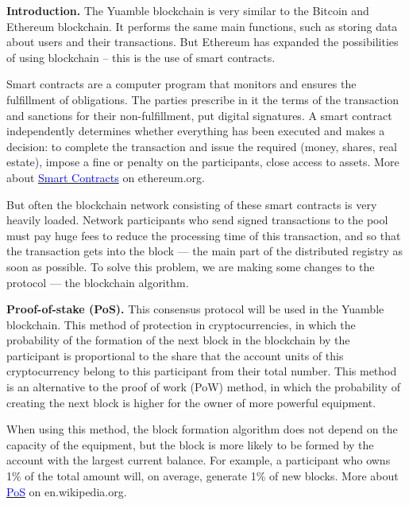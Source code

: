 \documentclass[11pt]{article}
\begin{document}
\begin{multicols}{2}

\textbf{Introduction.}
The Yuamble blockchain is very similar to the Bitcoin and Ethereum blockchain. It performs the same main functions, such as storing data about users and their transactions. But Ethereum has expanded the possibilities of using blockchain – this is the use of smart contracts.

Smart contracts are a computer program that monitors and ensures the fulfillment of obligations. The parties prescribe in it the terms of the transaction and sanctions for their non-fulfillment, put digital signatures. A smart contract independently determines whether everything has been executed and makes a decision: to complete the transaction and issue the required (money, shares, real estate), impose a fine or penalty on the participants, close access to assets. More about \href{https://ethereum.org/en/developers/docs/smart-contracts}{\textcolor{blue}{Smart Contracts}} on ethereum.org.

But often the blockchain network consisting of these smart contracts is very heavily loaded. Network participants who send signed transactions to the pool must pay huge fees to reduce the processing time of this transaction, and so that the transaction gets into the block — the main part of the distributed registry as soon as possible. To solve this problem, we are making some changes to the protocol — the blockchain algorithm.

\vspace{1\baselineskip}
\textbf{Proof-of-stake (PoS).}
This consensus protocol will be used in the Yuamble blockchain. This method of protection in cryptocurrencies, in which the probability of the formation of the next block in the blockchain by the participant is proportional to the share that the account units of this cryptocurrency belong to this participant from their total number. This method is an alternative to the proof of work (PoW) method, in which the probability of creating the next block is higher for the owner of more powerful equipment.

When using this method, the block formation algorithm does not depend on the capacity of the equipment, but the block is more likely to be formed by the account with the largest current balance. For example, a participant who owns 1\% of the total amount will, on average, generate 1\% of new blocks. More about \href{https://en.wikipedia.org/wiki/Proof_of_stake}{\textcolor{blue}{PoS}} on en.wikipedia.org.


\end{multicols}
\end{document}
